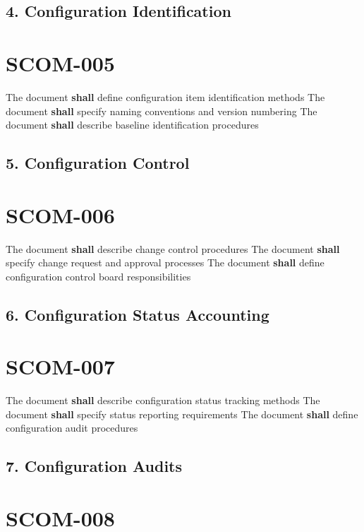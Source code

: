 \subsection{4. Configuration Identification}

\section{SCOM-005}\label{SCOM-005}

The document \textbf{shall} define configuration item identification methods
The document \textbf{shall} specify naming conventions and version numbering
The document \textbf{shall} describe baseline identification procedures

\subsection{5. Configuration Control}

\section{SCOM-006}\label{SCOM-006}

The document \textbf{shall} describe change control procedures
The document \textbf{shall} specify change request and approval processes
The document \textbf{shall} define configuration control board responsibilities

\subsection{6. Configuration Status Accounting}

\section{SCOM-007}\label{SCOM-007}

The document \textbf{shall} describe configuration status tracking methods
The document \textbf{shall} specify status reporting requirements
The document \textbf{shall} define configuration audit procedures

\subsection{7. Configuration Audits}

\section{SCOM-008}\label{SCOM-008}


